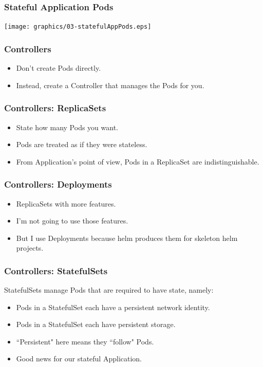 \begin{frame}
    \frametitle{Stateful Application Pods}
    \texttt{[image: graphics/03-statefulAppPods.eps]}
\end{frame}

\begin{frame}
    \frametitle{Controllers}
    \begin{itemize}
        \item Don't create Pods directly.
        \item Instead, create a Controller that manages the Pods for you.
    \end{itemize}
\end{frame}

\begin{frame}
    \frametitle{Controllers: ReplicaSets}
    \begin{itemize}
        \item State how many Pods you want.\pause
        \item Pods are treated as if they were stateless.\pause
        \item From Application's point of view, Pods in a ReplicaSet are indistinguishable.
    \end{itemize}
\end{frame}

\begin{frame}
    \frametitle{Controllers: Deployments}
    \begin{itemize}
        \item ReplicaSets with more features.\pause
        \item I'm not going to use those features.\pause
        \item But I use Deployments because helm produces them for skeleton helm projects.
    \end{itemize}
\end{frame}

\begin{frame}
    \frametitle{Controllers: StatefulSets}
    StatefulSets manage Pods that are required to have state, namely:\pause
    \begin{itemize}
        \item Pods in a StatefulSet each have a persistent network identity.\pause
        \item Pods in a StatefulSet each have persistent storage.\pause
        \item ``Persistent" here means they ``follow" Pods.\pause
        \item Good news for our stateful Application.
    \end{itemize}
\end{frame}

